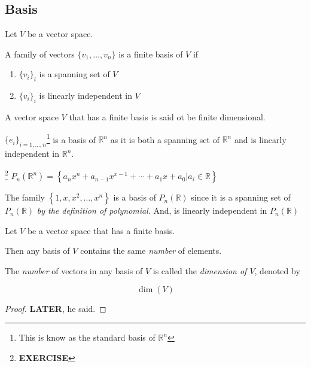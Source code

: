 \subsection{Basis}

\begin{definition}
	Let $V$ be a vector space.

	A family of vectors $\{v_1, \ldots, v_n\}$ is a finite basis of $V$ if 

	\begin{enumerate}
		\item $\{v_i\}_i$ is a spanning set of $V$
		\item $\{v_i\}_i$ is linearly independent in $V$
	\end{enumerate}

	A vector space $V$ that has a finite basis is said ot be finite dimensional.
\end{definition}

\begin{example}
	$\{e_i\}_{i=1,\ldots,n}$\footnote{This is know as the standard basis of $\mathbb{R}^n$} is a basis of $\mathbb{R}^n$ as it is both a spanning set of $\mathbb{R}^n$ and is linearly independent in $\mathbb{R}^n$.
\end{example}

\begin{example}\footnote{\textbf{EXERCISE}}
	$P_n(\mathbb{R}^n) = \left\{a_nx^n+a_{n-1}x^{x-1}+\cdots+a_1x+a_0 | a_i \in \mathbb{R}\right\}$

	The family $\left\{1,x,x^2,\ldots,x^n\right\}$ is a basis of $P_n(\mathbb{R})$ since it is a spanning set of $P_n(\mathbb{R})$ \textit{by the definition of polynomial}. And, is linearly independent in $P_n(\mathbb{R})$
\end{example}

\begin{theorem}
	Let $V$ be a vector space that has a finite basis.

	Then any basis of $V$ contains the same \textit{number} of elements.

	The \textit{number} of vectors in any basis of $V$ is called the \textit{dimension of $V$}, denoted by

	\[\dim(V)\]
\end{theorem}

\begin{proof}
	\textbf{LATER}, he said.
\end{proof}

